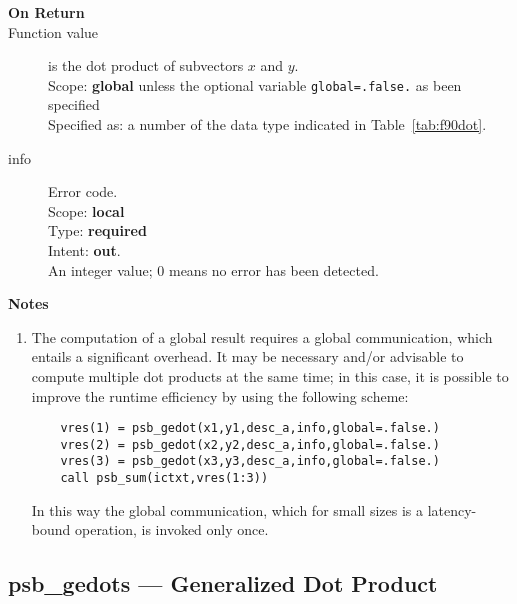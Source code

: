 \begin{description}
\item[\bf On Return] 
\item[Function value] is the dot product of subvectors $x$ and $y$.\\
Scope: {\bf global}  unless the optional variable
\verb|global=.false.| as been specified\\
Specified as: a number of the data type indicated in Table~\ref{tab:f90dot}.
\item[info] Error code.\\
Scope: {\bf local} \\
Type: {\bf required} \\
Intent: {\bf out}.\\
An integer value; 0 means no error has been detected. 
\end{description}

{\par\noindent\large\bfseries Notes}
\begin{enumerate}
\item The computation of a global result requires a global
  communication, which entails a significant overhead. It may be
  necessary and/or advisable to compute multiple dot products at the same 
  time; in this case, it is possible to improve the runtime efficiency
  by using the following scheme:
  \begin{lstlisting}
    vres(1) = psb_gedot(x1,y1,desc_a,info,global=.false.)
    vres(2) = psb_gedot(x2,y2,desc_a,info,global=.false.)
    vres(3) = psb_gedot(x3,y3,desc_a,info,global=.false.)
    call psb_sum(ictxt,vres(1:3))
  \end{lstlisting}
  In this way the global communication, which for small sizes is a
  latency-bound operation, is invoked only once.
\end{enumerate}

%
%

\clearpage\subsection*{psb\_gedots --- Generalized Dot Product}

